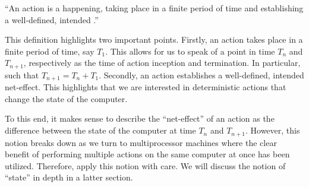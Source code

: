 \begin{definition}

``An action is a happening, taking place in a finite period of time and
establishing a well-defined, intended .''
\cite{dijkstra-introduction}

\end{definition}

This definition highlights two important points. Firstly, an action takes place
in a finite period of time, say $T_1$. This allows for us to speak of a point
in time $T_n$ and $T_{n+1}$, respectively as the time of action inception and
termination. In particular, such that $T_{n+1}=T_n+T_1$. Secondly, an action
establishes a well-defined, intended net-effect. This highlights that we are
interested in deterministic actions that change the state of the computer.

To this end, it makes sense to describe the ``net-effect'' of an action as the
difference between the state of the computer at time $T_n$ and $T_{n+1}$.
However, this notion breaks down as we turn to multiprocessor machines where
the clear benefit of performing multiple actions on the same computer at once
has been utilized.  Therefore, apply this notion with care. We will discuss the
notion of ``state'' in depth in a latter section.

